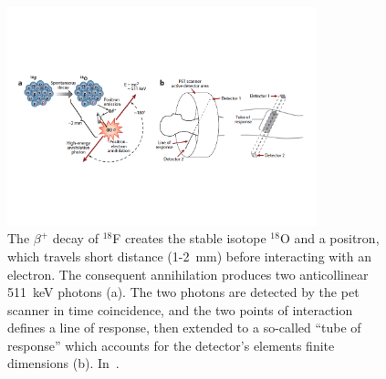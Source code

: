 \begin{figure}[!htbp]
\centering
\includegraphics[width=0.8\textwidth, trim = {0 3cm 0 3cm}, clip]{03_GraphicFiles/chapter1_Introduction/NM_PET_principle.pdf}
\caption{The $\beta^{+}$ decay of $^{18}$F creates the stable isotope $^{18}$O and a positron, which travels short distance (1-2~mm) before interacting with an electron. The consequent annihilation produces two anticollinear 511~keV photons (a). The two photons are detected by the \gls{pet} scanner in time coincidence, and the two points of interaction defines a line of response, then extended to a so-called \enquote{tube of response} which accounts for the detector's elements finite dimensions (b). In~\cite{Vaquero2015}.}
\label{chap2::fig::NM_PET_princ}
\end{figure}   
